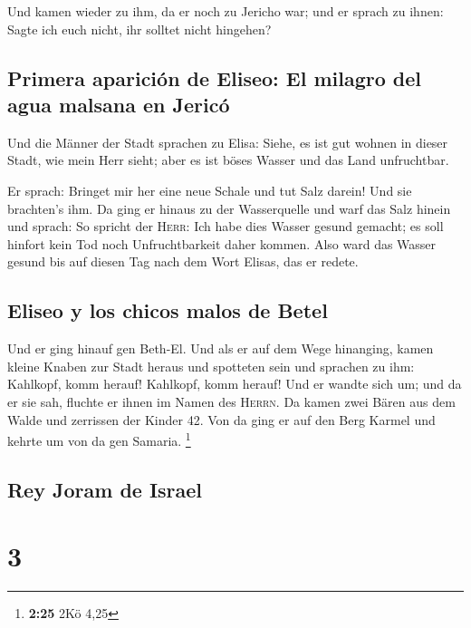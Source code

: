  Und kamen wieder zu ihm, da er noch zu Jericho war; und
er sprach zu ihnen: Sagte ich euch nicht, ihr solltet nicht hingehen?

\hypertarget{primera-apariciuxf3n-de-eliseo-el-milagro-del-agua-malsana-en-jericuxf3}{%
\subsection{Primera aparición de Eliseo: El milagro del agua malsana en
Jericó}\label{primera-apariciuxf3n-de-eliseo-el-milagro-del-agua-malsana-en-jericuxf3}}

 Und die Männer der Stadt sprachen zu Elisa: Siehe, es
ist gut wohnen in dieser Stadt, wie mein Herr sieht; aber es ist böses
Wasser und das Land unfruchtbar.

 Er sprach: Bringet mir her eine neue Schale und tut Salz
darein! Und sie brachten's ihm.  Da ging er hinaus zu der
Wasserquelle und warf das Salz hinein und sprach: So spricht der
\textsc{Herr}: Ich habe dies Wasser gesund gemacht; es soll hinfort kein
Tod noch Unfruchtbarkeit daher kommen.  Also ward das
Wasser gesund bis auf diesen Tag nach dem Wort Elisas, das er redete.

\hypertarget{eliseo-y-los-chicos-malos-de-betel}{%
\subsection{Eliseo y los chicos malos de
Betel}\label{eliseo-y-los-chicos-malos-de-betel}}

 Und er ging hinauf gen Beth-El. Und als er auf dem Wege
hinanging, kamen kleine Knaben zur Stadt heraus und spotteten sein und
sprachen zu ihm: Kahlkopf, komm herauf! Kahlkopf, komm herauf!
 Und er wandte sich um; und da er sie sah, fluchte er
ihnen im Namen des \textsc{Herrn}. Da kamen zwei Bären aus dem Walde und
zerrissen der Kinder 42.  Von da ging er auf den Berg
Karmel und kehrte um von da gen Samaria. \footnote{\textbf{2:25} 2Kö
  4,25}

\hypertarget{rey-joram-de-israel}{%
\subsection{Rey Joram de Israel}\label{rey-joram-de-israel}}

\hypertarget{section-2}{%
\section{3}\label{section-2}}

